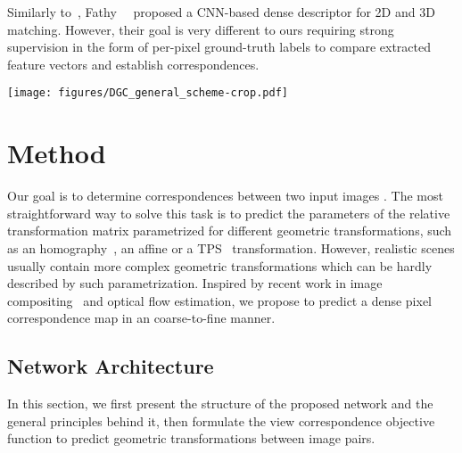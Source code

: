 \documentclass[10pt,twocolumn,letterpaper]{article}
\begin{document}
Similarly to~\cite{UCN}, Fathy~\etal~\cite{Hierarchy2D3DMatching} proposed a CNN-based dense descriptor for 2D and 3D matching. However, their goal is very different to ours requiring strong supervision in the form of per-pixel ground-truth labels to compare extracted feature vectors and establish correspondences. 



\begin{figure*}[t]
  \centering
    \texttt{[image: figures/DGC\_general\_scheme-crop.pdf]}
  \caption{Overview of our proposed iterative architecture \texttt{DGC-Net} consisting of four major components: 1) the \textbf{feature pyramid creator}. 2) the \textbf{correlation layer} estimates the pairwise similarity score of the source and target feature descriptors. 3) the fully convolutional \textbf{correspondence map decoders} predict the dense correspondence map between input image pair at each level of the feature pyramid. 4) the \textbf{warping layer} warps features of the source image using the upsampled transforming grid from a correspondence map decoder. The \textbf{matchability decoder} is a tiny CNN that predicts a confidence map with higher scores for those pixels in the source image that have correspondences in the target. See Sec.~\ref{ssec:net_arch} for more details.}
 \label{fig:f_pipeline}
 \vspace{-2mm}
\end{figure*}

\vspace{-2mm}
\section{Method}\label{sec:method}
\vspace{-2mm}


Our goal is to determine correspondences between two input images . The most straightforward way to solve this task is to predict the parameters of the relative transformation matrix parametrized for different geometric transformations, such as an homography~\cite{DeepHomography}, an affine  or a TPS~\cite{Rocco17} transformation. However, realistic scenes usually contain more complex geometric transformations which can be hardly described by such parametrization. Inspired by recent work in image compositing~\cite{st-gan} and optical flow estimation, we propose to predict a dense pixel correspondence map  in an coarse-to-fine manner.

\subsection{Network Architecture}\label{ssec:net_arch}
In this section, we first present the structure of the proposed network and the general principles behind it, then formulate the view correspondence objective function to predict geometric transformations between image pairs.
\end{document}
